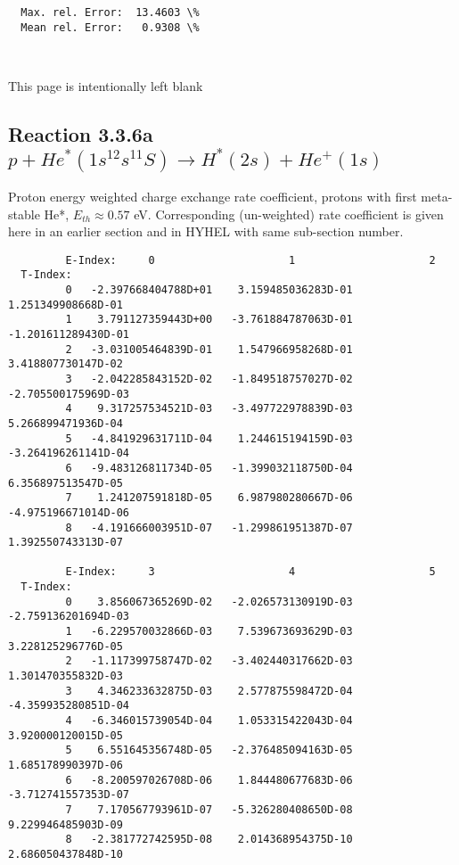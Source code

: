 \documentclass[12pt,dvipdfmx]{article}
\begin{document}
{\begin{small}
\begin{verbatim}
  Max. rel. Error:  13.4603 \%
  Mean rel. Error:   0.9308 \%



\end{verbatim}\end{small}

\newpage
This page is intentionally left blank
\newpage

\subsection{
Reaction 3.3.6a $   p + He^*(1s^12s^11S) \rightarrow H^*(2s) + He^+(1s) $
}
Proton energy weighted charge exchange rate coefficient,
protons with first meta-stable He*, $E_{th} \approx 0.57$ eV.
Corresponding (un-weighted) rate coefficient is given here in an earlier section and in HYHEL with same sub-section number.

\begin{small}\begin{verbatim}
         E-Index:     0                     1                     2
  T-Index:
         0   -2.397668404788D+01    3.159485036283D-01    1.251349908668D-01
         1    3.791127359443D+00   -3.761884787063D-01   -1.201611289430D-01
         2   -3.031005464839D-01    1.547966958268D-01    3.418807730147D-02
         3   -2.042285843152D-02   -1.849518757027D-02   -2.705500175969D-03
         4    9.317257534521D-03   -3.497722978839D-03    5.266899471936D-04
         5   -4.841929631711D-04    1.244615194159D-03   -3.264196261141D-04
         6   -9.483126811734D-05   -1.399032118750D-04    6.356897513547D-05
         7    1.241207591818D-05    6.987980280667D-06   -4.975196671014D-06
         8   -4.191666003951D-07   -1.299861951387D-07    1.392550743313D-07

         E-Index:     3                     4                     5
  T-Index:
         0    3.856067365269D-02   -2.026573130919D-03   -2.759136201694D-03
         1   -6.229570032866D-03    7.539673693629D-03    3.228125296776D-05
         2   -1.117399758747D-02   -3.402440317662D-03    1.301470355832D-03
         3    4.346233632875D-03    2.577875598472D-04   -4.359935280851D-04
         4   -6.346015739054D-04    1.053315422043D-04    3.920000120015D-05
         5    6.551645356748D-05   -2.376485094163D-05    1.685178990397D-06
         6   -8.200597026708D-06    1.844480677683D-06   -3.712741557353D-07
         7    7.170567793961D-07   -5.326280408650D-08    9.229946485903D-09
         8   -2.381772742595D-08    2.014368954375D-10    2.686050437848D-10


\end{verbatim}
\end{small}}
\end{document}
